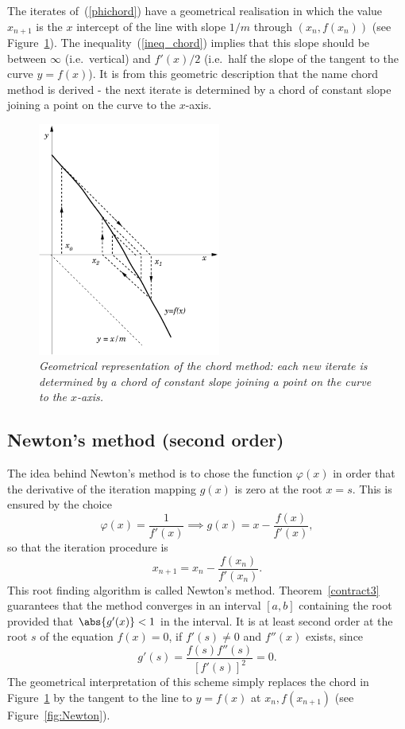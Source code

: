 The iterates of~(\ref{phichord}) have a geometrical realisation in
which the value $x_{n+1}$ is the $x$ intercept of the line with slope
$1/m$ through $(x_n,f(x_n))$ (see Figure~\ref{fig:chord}).   The
inequality~(\ref{ineq_chord}) implies that this slope should be
between $\infty$ (i.e.\ vertical) and $f'(x)/2$ (i.e.\ half the slope of
the tangent to the curve $y=f(x)$).   It is from this geometric
description that the name chord method is derived - the next iterate
is determined by a chord of constant slope joining a point on the
curve to the $x$-axis.

\begin{figure}
  \centerline{\includegraphics[width=60mm]{figures/chord}}
  \caption{\label{fig:chord} \it Geometrical representation of the
    chord method: each new iterate is determined by a chord of
    constant slope joining a point on the curve to the $x$-axis.}
\end{figure}

\medskip

\subsection{Newton's method (second order)}

The idea behind Newton's method is to chose the function $\varphi(x)$
in order that the derivative of the iteration mapping $g(x)$ is zero
at the root $x=s$.  This is ensured by the choice
%
\begin{equation}
  \varphi(x) = \frac{1}{f'(x)} \implies
  g(x) = x - \frac{f(x)}{f'(x)} , \label{gnewt}
\end{equation}
%
so that the iteration procedure is
%
\begin{equation}
  x_{n+1} = x_n - \frac{f(x_n)}{f'(x_n)} .
  \label{Newton}
\end{equation}
%
This root finding algorithm is called Newton's method.
Theorem~\ref{contract3} guarantees that the method converges in an
interval $[a,b]$ containing the root provided that $\abs{g'(x)} < 1$ in
the interval.  It is at least second order at the root $s$ of the
equation $f(x) = 0$, if $f'(s) \ne 0$ and $f''(x)$ exists, since
%
\begin{equation}
  g'(s) = \frac{f(s) f''(s)}{[f'(s)]^2} = 0 .
  \label{gpalpha}
\end{equation}
%
The geometrical interpretation of this scheme simply replaces the
chord in Figure~\ref{fig:chord} by the tangent to the line to $y=f(x)$
at $x_n,f(x_{n+1})$ (see Figure~\ref{fig:Newton}).

